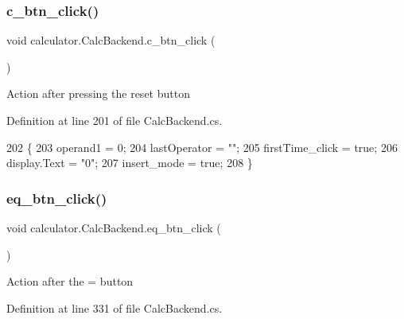 \subsubsection{c\+\_\+btn\+\_\+click()}
{\footnotesize\ttfamily void calculator.\+Calc\+Backend.\+c\+\_\+btn\+\_\+click (\begin{DoxyParamCaption}{ }\end{DoxyParamCaption})}



Action after pressing the reset button 



Definition at line 201 of file Calc\+Backend.\+cs.


\begin{DoxyCode}
202         \{
203             operand1 = 0;
204             lastOperator = \textcolor{stringliteral}{""};
205             firstTime\_click = \textcolor{keyword}{true};
206             display.Text = \textcolor{stringliteral}{"0"};
207             insert\_mode = \textcolor{keyword}{true};
208         \}
\end{DoxyCode}
\mbox{\label{classcalculator_1_1_calc_backend_a77c18867d24590ae555f7fc6162d5f42}} 
\subsubsection{eq\+\_\+btn\+\_\+click()}
{\footnotesize\ttfamily void calculator.\+Calc\+Backend.\+eq\+\_\+btn\+\_\+click (\begin{DoxyParamCaption}{ }\end{DoxyParamCaption})}



Action after the \textquotesingle{}=\textquotesingle{} button 



Definition at line 331 of file Calc\+Backend.\+cs.


